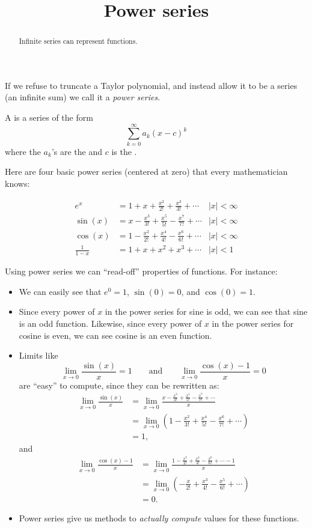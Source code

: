 \documentclass{ximera}
\title[Dig-In:]{Power series}
\begin{document}
\begin{abstract}
  Infinite series can represent functions.
\end{abstract}
\maketitle

If we refuse to truncate a Taylor polynomial, and instead allow it to
be a series (an infinite sum) we call it a \textit{power series}. 

\begin{definition}
  A  is a series of the form
  \[
  \sum_{k=0}^\infty a_k(x-c)^k
  \]
  where the $a_k$'s are the  and $c$ is the
  .
\end{definition}

Here are four basic power series (centered at zero) that every
mathematician knows:

\begin{align*}
           e^x &= 1 + x + \frac{x^2}{2!} + \frac{x^3}{3!} + \cdots &|x|< \infty\\
       \sin(x) &= x - \frac{x^3}{3!} + \frac{x^5}{5!} -\frac{x^7}{7!} + \cdots &|x|< \infty\\
       \cos(x) &= 1-\frac{x^2}{2!} + \frac{x^4}{4!} -\frac{x^6}{6!} + \cdots &|x|< \infty\\
 \frac{1}{1-x} &= 1+ x+ x^2 + x^3 + \cdots &|x|< 1
\end{align*}

Using power series we can ``read-off'' properties of functions. For instance:
\begin{itemize}
\item We can easily see that $e^0 =1$, $\sin(0)=0$, and $\cos(0) =1$.
\item Since every power of $x$ in the power series for sine is odd, we
  can see that sine is an odd function. Likewise, since every power of
  $x$ in the power series for cosine is even, we can see cosine is an
  even function.
\item Limits like
  \[
  \lim_{x\to 0}\frac{\sin(x)}{x} = 1\qquad\text{and}\qquad \lim_{x\to 0} \frac{\cos(x)-1}{x} = 0
  \]
  are ``easy'' to compute, since they can be rewritten as:
  \begin{align*}
    \lim_{x\to 0}\frac{\sin(x)}{x} &=\lim_{x\to 0} \frac{x - \frac{x^3}{3!} + \frac{x^5}{5!} -\frac{x^7}{7!} + \cdots}{x}\\
    &=\lim_{x\to 0} \left(1 - \frac{x^2}{3!} + \frac{x^4}{5!} -\frac{x^6}{7!} + \cdots\right)\\
    &=1,
  \end{align*}
  and
  \begin{align*}
    \lim_{x\to 0} \frac{\cos(x)-1}{x}&=\lim_{x\to 0} \frac{1-\frac{x^2}{2!} + \frac{x^4}{4!} -\frac{x^6}{6!} + \cdots-1}{x}\\
    &=\lim_{x\to 0} \left(-\frac{x}{2!} + \frac{x^3}{4!} -\frac{x^5}{6!} + \cdots\right)\\
    &=0.
  \end{align*}
\item Power series give us methods to \textit{actually compute} values
  for these functions.
\end{itemize}
\end{document}
